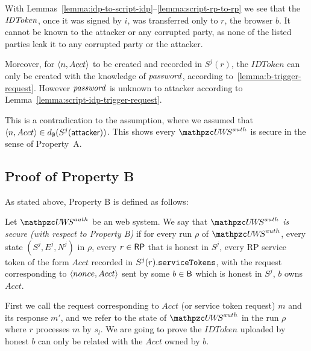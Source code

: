   
  With Lemmas~\ref{lemma:idp-to-script-idp}--\ref{lemma:script-rp-to-rp} we see that the $\mathit{IDToken}$, once it was signed by $i$, was transferred only to $r$, the browser $b$. It cannot be known to the attacker or any corrupted party, as none of the listed parties leak it to any corrupted party or the attacker.

Moreover, for $\langle n,Acct\rangle$ to be created and recorded in $S^j(r)$, the $IDToken$ can only be created with the knowledge of $\mathit{password}$, according to~\ref{lemma:b-trigger-request}. However $\mathit{password}$ is unknown to attacker according to Lemma~\ref{lemma:script-idp-trigger-request}. 

This is a contradication to the assumption, where we assumed that
$\langle n,Acct\rangle \in d_{\emptyset}(S^j(\mathsf{attacker}))$. This shows
every $\uppressoauthwebsystem$ is secure in the sense of Property~A.
  
  \subsection{Proof of Property B}
  As stated above, Property B is defined as follows:
  \begin{definition}\label{def:B}
    Let $\uppressoauthwebsystem$ be an \uppresso web system. We say that
    \emph{$\uppressoauthwebsystem$ is secure (with respect to Property B)} if
    for every run $\rho$ of $\uppressoauthwebsystem$, every state $(S^j, E^j, N^j)$
    in $\rho$, every $r\in \mathsf{RP}$ that is honest in $S^j$, 
    every RP service token of the form $Acct$ recorded in
    $S^j(r).\mathtt{serviceTokens}$, with the request corresponding to
    $\langle {{}nonce, Acct} \rangle$ sent by some $b\in \mathsf{B}$ which is honest in $S^j$, $b$ owns $Acct$.
  \end{definition}
  
  First we call the request corresponding to $Acct$ (or service token request) $m$ and
  its response $m'$, and we refer to the state of $\uppressoauthwebsystem$ in the run 
  $\rho$ where $r$ processes $m$ by $s_l$. We are going to prove the $IDToken$ uploaded 
  by honest $b$ can only be related with the $Acct$ owned by $b$.
  
